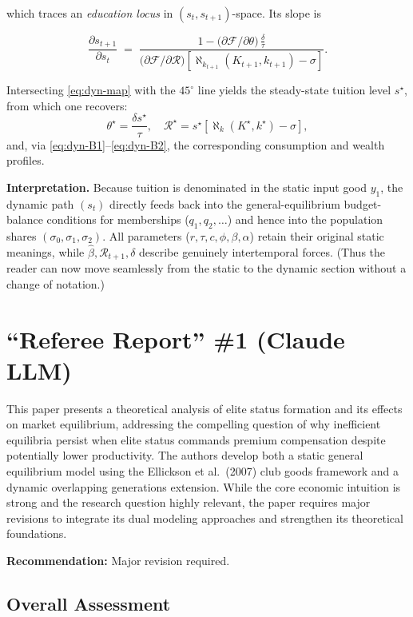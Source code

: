 \documentclass[12pt,letterpaper]{article}
\begin{document}
which traces an \emph{education locus} in $(s_t,s_{t+1})$-space.
Its slope is

\begin{equation}\label{eq:dyn-slope}
	\frac{\partial s_{t+1}}{\partial s_t}
	\;=\;
	\frac{1-\bigl(\partial\mathcal{F}/\partial\theta\bigr)\,\frac{\delta}{\tau}}
	{ \bigl(\partial\mathcal{F}/\partial \mathcal{R}\bigr)
		\left[\aleph_{k_{t+1}}(K_{t+1},k_{t+1})-\sigma\right] }.
\end{equation}

Intersecting \eqref{eq:dyn-map} with the $45^{\circ}$ line yields the steady-state
tuition level $s^\star$, from which one recovers:
\[
\theta^\star = \frac{\delta s^\star}{\tau},\quad
\mathcal{R}^\star = s^\star\!\left[\aleph_{k}(K^\star,k^\star)-\sigma\right],
\]
and, via \eqref{eq:dyn-B1}–\eqref{eq:dyn-B2}, the corresponding
consumption and wealth profiles.

\medskip
\noindent
\textbf{Interpretation.}  
Because tuition is denominated in the static input good $y_1$, the
dynamic path $(s_t)$ directly feeds back into the general-equilibrium
budget-balance conditions for memberships ($q_1,q_2,\dots$) and hence
into the population shares $(\sigma_0,\sigma_1,\sigma_2)$.  All parameters
($r,\tau,c,\phi,\beta,\alpha$) retain their original static meanings, while
$\hat{\beta},\mathcal{R}_{t+1},\delta$ describe genuinely intertemporal
forces.  (Thus the reader can now move seamlessly from the static to the
dynamic section without a change of notation.)
		
\section{``Referee Report'' \#1 (Claude LLM)}

This paper presents a theoretical analysis of elite status formation and its effects on market equilibrium, addressing the compelling question of why inefficient equilibria persist when elite status commands premium compensation despite potentially lower productivity. The authors develop both a static general equilibrium model using the Ellickson et al.\ (2007) club goods framework and a dynamic overlapping generations extension. While the core economic intuition is strong and the research question highly relevant, the paper requires major revisions to integrate its dual modeling approaches and strengthen its theoretical foundations.

\textbf{Recommendation:} Major revision required.

\subsection{Overall Assessment}
\end{document}
